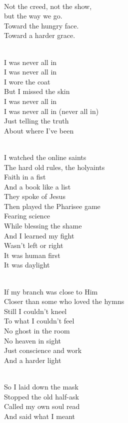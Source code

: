\begin{lyrics}
\\
Not the creed, not the show,\\
but the way we go.\\
Toward the hungry face.\\
Toward a harder grace.

\\
I was never all in\\
I was never all in\\
I wore the coat\\
But I missed the skin\\
I was never all in\\
I was never all in
(never all in)\\
Just telling the truth\\
About where I’ve been

\\
I watched the online saints\\
The hard old rules, the holyaints\\
Faith in a fist\\
And a book like a list\\
They spoke of Jesus\\
Then played the Pharisee game\\
Fearing science\\
While blessing the shame\\
And I learned my fight\\
Wasn’t left or right\\
It was human first\\
It was daylight

\\
If my branch was close to Him\\
Closer than some who loved the hymns\\
Still I couldn’t kneel\\
To what I couldn’t feel\\
No ghost in the room\\
No heaven in sight\\
Just conscience and work\\
And a harder light

\\
So I laid down the mask\\
Stopped the old half-ask\\
Called my own soul read\\
And said what I meant


\end{lyrics}
